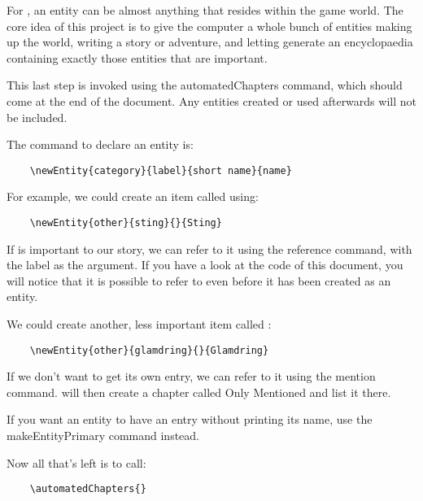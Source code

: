 \documentclass[openany]{book}
\begin{document}
For \LoreTex{}, an entity can be almost anything that resides within the game world. The core idea of this project is to give the computer a whole bunch of entities making up the world, writing a story or adventure, and letting \LoreTex{} generate an encyclopaedia containing exactly those entities that are important.

This last step is invoked using the automatedChapters command, which should come at the end of the document. Any entities created or used afterwards will not be included.

The command to declare an entity is:
\begin{verbatim}
	\newEntity{category}{label}{short name}{name}
\end{verbatim}
For example, we could create an item called  using:
\begin{verbatim}
	\newEntity{other}{sting}{}{Sting}
\end{verbatim}
If  is important to our story, we can refer to it using the reference command, with the label as the argument. If you have a look at the code of this document, you will notice that it is possible to refer to  even before it has been created as an entity.

We could create another, less important item called :
\begin{verbatim}
	\newEntity{other}{glamdring}{}{Glamdring}
\end{verbatim}
If we don't want  to get its own entry, we can refer to it using the mention command. \LoreTex{} will then create a chapter called Only Mentioned and list it there.

If you want an entity to have an entry without printing its name, use the makeEntityPrimary command instead.


Now all that's left is to call:
\begin{verbatim}
	\automatedChapters{}
\end{verbatim}

\automatedChapters{}
\end{document}
